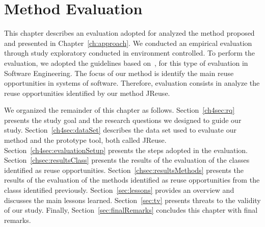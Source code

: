 \chapter{Method Evaluation}
\label{ch:evaluation}


This chapter describes an evaluation adopted for analyzed the method proposed and presented in Chapter~\ref{ch:approach}. We conducted an empirical evaluation through   study exploratory conducted in environment controlled. To perform the evaluation, we adopted the guidelines based on~\cite{wohlin2012experimentation}, for this type of evaluation in Software Engineering.  The focus of our method is identify the main reuse opportunities in systems of software. Therefore, evaluation consists in analyze the reuse opportunities identified by our method JReuse.  

We organized the remainder of this chapter as follows. Section~\ref{ch4sec:rq} presents the study goal and the research questions we designed to guide our study. Section~\ref{ch4sec:dataSet} describes the data set used to evaluate our method and the prototype tool, both called JReuse. Section~\ref{ch4sec:evaluationSetup} presents the steps adopted in the evaluation. Section~\ref{chsec:resultsClass} presents the results of the evaluation of the classes identified as reuse opportunities. Section~\ref{chsec:resultsMethods} presents the results of the evaluation of the methods identified as reuse opportunities from the classs identified previously. Section~\ref{sec:lessons} provides an overview and discusses the main lessons learned. Section~\ref{sec:tv} presents threats to the validity of our study. Finally, Section~\ref{sec:finalRemarks} concludes this chapter with final remarks.


